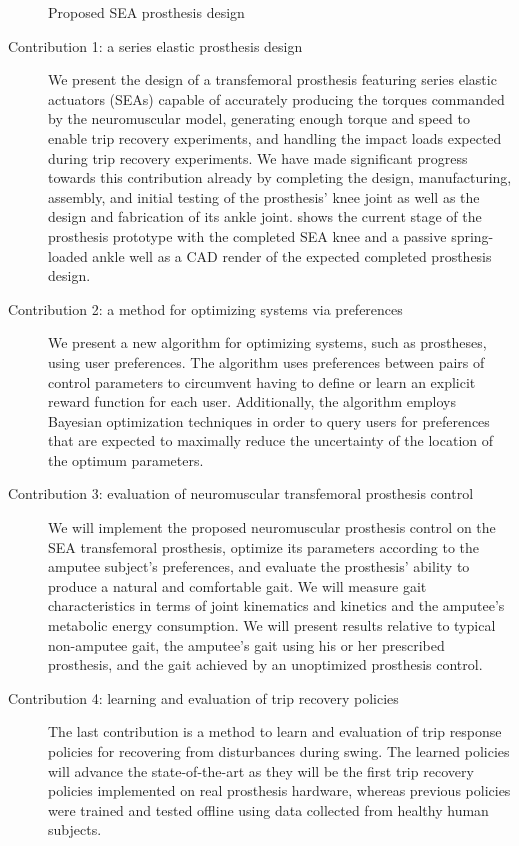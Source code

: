 \begin{description}
    \begin{marginfigure}
        \centering
        \caption{Proposed SEA prosthesis design}
        \label{fig:prosthesis_design}
    \end{marginfigure}
    \item[Contribution 1: a series elastic prosthesis design] We present the
    design of a transfemoral prosthesis featuring series elastic actuators
    (SEAs) capable of accurately producing the torques commanded by the
    neuromuscular model, generating enough torque and speed to enable trip
    recovery experiments, and handling the impact loads expected during trip
    recovery experiments. We have made significant progress towards this
    contribution already by completing the design, manufacturing, assembly, and
    initial testing of the prosthesis' knee joint as well as the design and
    fabrication of its ankle joint.  shows the
    current stage of the prosthesis prototype with the completed SEA knee and a
    passive spring-loaded ankle well as a CAD render of the expected completed
    prosthesis design.

    \item[Contribution 2: a method for optimizing systems via preferences]
    We present a new algorithm for optimizing systems, such as prostheses, using
    user preferences.  The algorithm uses preferences between pairs of control
    parameters to circumvent having to define or learn an explicit reward
    function for each user. Additionally, the algorithm employs Bayesian
    optimization techniques in order to query users for preferences that are
    expected to maximally reduce the uncertainty of the location of the optimum
    parameters.

    \item[Contribution 3: evaluation of neuromuscular transfemoral prosthesis
    control] We will implement the proposed neuromuscular prosthesis control on
    the SEA transfemoral prosthesis, optimize its parameters according to the
    amputee subject's preferences, and evaluate the prosthesis' ability to
    produce a natural and comfortable gait. We will measure gait characteristics
    in terms of joint kinematics and kinetics and the amputee's metabolic energy
    consumption. We will present results relative to typical non-amputee gait,
    the amputee's gait using his or her prescribed prosthesis, and the
    gait achieved by an unoptimized prosthesis control.

    \item[Contribution 4: learning and evaluation of trip recovery policies] The
    last contribution is a method to learn and evaluation of trip response
    policies for recovering from disturbances during swing. The learned policies
    will advance the state-of-the-art as they will be the first trip recovery
    policies implemented on real prosthesis hardware, whereas previous policies
    were trained and tested offline using data collected from healthy human
    subjects.
\end{description}
